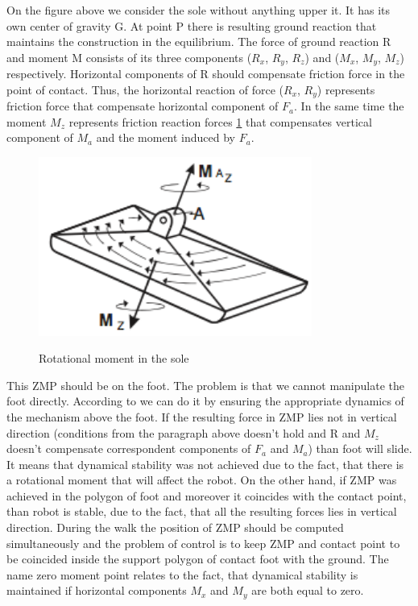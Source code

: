 \documentclass[11pt,a4paper]{article}
\begin{document}
On the figure above we consider the sole without anything upper it. It has its own center of gravity G. At point P there is resulting ground reaction that maintains the construction in the equilibrium. The force of ground reaction R and moment M consists of its three components ($R_x$, $R_y$, $R_z$) and ($M_x$, $M_y$, $M_z$) respectively. Horizontal components of R should compensate friction force in the point of contact. Thus, the horizontal reaction of force ($R_x$, $R_y$) represents 
friction force that compensate horizontal component of $F_a$. In the same time the moment $M_z$ represents friction reaction forces \cref{fig:2} that compensates vertical component of $M_a$ and the moment induced by $F_a$. \cite{vukobratovic2004zero}

	\begin{figure}[h!]
		\vspace{-0.2cm}
		\centering
		{\includegraphics[width=0.8\textwidth]{2}}
		\caption{Rotational moment in the sole}
		\label{fig:2}
		\vspace{-0.1cm}
	\end{figure}

This ZMP should be on the foot. The problem is that we cannot manipulate the foot directly. According to \cite{vukobratovic2004zero} we can do it by ensuring the appropriate dynamics of the mechanism above the foot. If the resulting force in ZMP lies not in vertical direction (conditions from the paragraph above doesn't hold and R and $M_z$ doesn't compensate correspondent components of $F_a$ and $M_a$) than foot will slide. It means that dynamical stability was not achieved due to the fact, that there is a rotational moment that will affect the robot. On the other hand, if ZMP was achieved in the polygon of foot and moreover it coincides with the contact point, than robot is stable, due to the fact, that all the resulting forces lies in vertical direction. During the walk the position of ZMP should be computed simultaneously and the problem of control is to keep ZMP and contact point to be coincided inside the support polygon of contact foot with the ground.
The name zero moment point relates to the fact, that dynamical stability is maintained if horizontal components $M_x$ and $M_y$ are both equal to zero.
	
\end{document}
